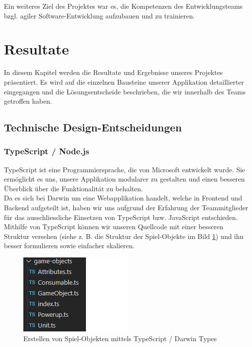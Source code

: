 \documentclass[11pt,a4paper,titlepage]{article}
\begin{document}
Ein weiteres Ziel des Projektes war es, die Kompetenzen des Entwicklungsteams bzgl. agiler Software-Entwicklung aufzubauen und zu trainieren.

\newpage

\section{Resultate}
In diesem Kapitel werden die Resultate und Ergebnisse unseres Projektes präsentiert.
Es wird auf die einzelnen Bausteine unserer Applikation detaillierter eingegangen und die Lösungsentscheide beschrieben, die wir innerhalb des Teams getroffen haben.

\subsection{Technische Design-Entscheidungen}
\subsubsection{TypeScript / Node.js}
TypeScript ist eine Programmiersprache, die von Microsoft entwickelt wurde. Sie ermöglicht es uns, unsere Applikation modularer zu gestalten und einen besseren Überblick über die Funktionalität zu behalten.\\
Da es sich bei Darwin um eine Webapplikation handelt, welche in Frontend und Backend aufgeteilt ist, haben wir uns aufgrund der Erfahrung der Teammitglieder für das ausschliessliche Einsetzen von TypeScript bzw. JavaScript entschieden.
Mithilfe von TypeScript können wir unseren Quellcode mit einer besseren Struktur versehen (siehe z. B. die Struktur der Spiel-Objekte im Bild \ref{types}) und ihn besser formulieren sowie einfacher skalieren.

\begin{figure}[H]
	\centering
	\includegraphics{darwintypes.png}
	\caption{Erstellen von Spiel-Objekten mittels TypeScript / Darwin Types}
	\label{types}
\end{figure}
\end{document}
